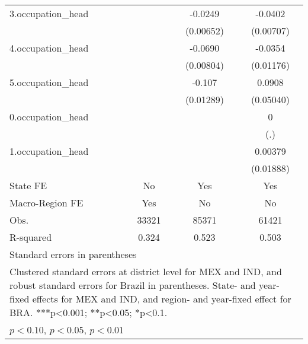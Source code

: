 \begin{table}[htbp]
{\begin{tabular}{l*{3}{c}}
3.occupation_head&                     &     -0.0249\sym{***}&     -0.0402\sym{***}\\
            &                     &   (0.00652)         &   (0.00707)         \\
4.occupation_head&                     &     -0.0690\sym{***}&     -0.0354\sym{***}\\
            &                     &   (0.00804)         &   (0.01176)         \\
5.occupation_head&                     &      -0.107\sym{***}&      0.0908\sym{*}  \\
            &                     &   (0.01289)         &   (0.05040)         \\
0.occupation_head&                     &                     &           0         \\
            &                     &                     &         (.)         \\
1.occupation_head&                     &                     &     0.00379         \\
            &                     &                     &   (0.01888)         \\
State FE    &          No         &         Yes         &         Yes         \\
Macro-Region FE &         Yes         &          No         &          No         \\
\hline
Obs.        &       33321         &       85371         &       61421         \\
R-squared   &       0.324         &       0.523         &       0.503         \\
\hline\hline
\multicolumn{4}{l}{\footnotesize Standard errors in parentheses}\\
\multicolumn{4}{l}{\footnotesize Clustered standard errors at district level for MEX and IND, and robust standard errors for Brazil in parentheses. State- and year-fixed effects for MEX and IND, and region- and year-fixed effect for BRA. ***p<0.001; **p<0.05; *p<0.1.}\\
\multicolumn{4}{l}{\footnotesize \sym{*} \(p<0.10\), \sym{**} \(p<0.05\), \sym{***} \(p<0.01\)}\\
\end{tabular}}
\end{table}
